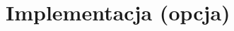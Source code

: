 \documentclass[../main.tex]{subfiles}
\begin{document}
\section{Implementacja (opcja)}
    
    \newpage
    
    \newpage
          
\end{document}
